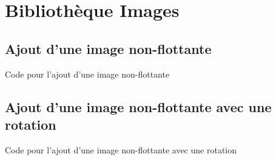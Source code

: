 \chapter{Bibliothèque Images}


\section{Ajout d'une image non-flottante}


\begin{Latex}{Code pour l'ajout d'une image non-flottante}
\end{Latex}

\section{Ajout d'une image non-flottante avec une rotation}


\begin{Latex}{Code pour l'ajout d'une image non-flottante avec une rotation}
\end{Latex}



